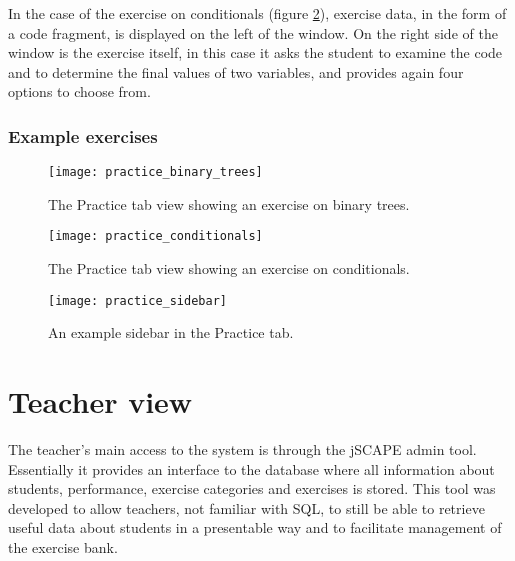 In the case of the exercise on conditionals (figure \ref{fig:practice_conditionals}), exercise data, in the form of a code fragment, is displayed on the left of the window. On the right side of the window is the exercise itself, in this case it asks the student to examine the code and to determine the final values of two variables, and provides again four options to choose from.

\newpage

\subsubsection{Example exercises}

\begin{figure}[H]
\centering
\texttt{[image: practice\_binary\_trees]}
\caption{The Practice tab view showing an exercise on binary trees.}
\label{fig:practice_binary_trees}
\end{figure}

\begin{figure}[H]
\centering
\texttt{[image: practice\_conditionals]}
\caption{The Practice tab view showing an exercise on conditionals.}
\label{fig:practice_conditionals}
\end{figure}

\begin{figure}[H]
\centering
\texttt{[image: practice\_sidebar]}
\caption{An example sidebar in the Practice tab.}
\label{fig:practice_sidebar}
\end{figure}


\section{Teacher view}
The teacher's main access to the system is through the jSCAPE admin tool. Essentially it provides an interface to the database where all information about students, performance, exercise categories and exercises is stored. This tool was developed to allow teachers, not familiar with SQL, to still be able to retrieve useful data about students in a presentable way and to facilitate management of the exercise bank.

